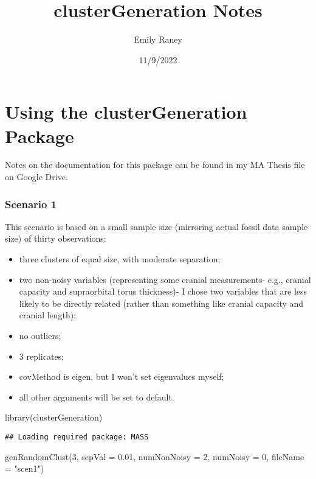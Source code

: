 \documentclass[
]{article}
\title{clusterGeneration Notes}
\author{Emily Raney}
\date{11/9/2022}
\newenvironment{Shaded}{\begin{snugshade}}{\end{snugshade}}
\newcommand{\AttributeTok}[1]{\textcolor[rgb]{0.77,0.63,0.00}{#1}}
\newcommand{\DecValTok}[1]{\textcolor[rgb]{0.00,0.00,0.81}{#1}}
\newcommand{\FloatTok}[1]{\textcolor[rgb]{0.00,0.00,0.81}{#1}}
\newcommand{\FunctionTok}[1]{\textcolor[rgb]{0.00,0.00,0.00}{#1}}
\newcommand{\NormalTok}[1]{#1}
\newcommand{\StringTok}[1]{\textcolor[rgb]{0.31,0.60,0.02}{#1}}
\providecommand{\tightlist}{%
  \setlength{\itemsep}{0pt}\setlength{\parskip}{0pt}}
\begin{document}
\maketitle

\hypertarget{using-the-clustergeneration-package}{%
\section{Using the clusterGeneration
Package}\label{using-the-clustergeneration-package}}

Notes on the documentation for this package can be found in my MA Thesis
file on Google Drive.

\hypertarget{scenario-1}{%
\subsubsection{Scenario 1}\label{scenario-1}}

This scenario is based on a small sample size (mirroring actual fossil
data sample size) of thirty observations:

\begin{itemize}
\tightlist
\item
  three clusters of equal size, with moderate separation;\\
\item
  two non-noisy variables (representing some cranial measurements- e.g.,
  cranial capacity and supraorbital torus thickness)- I chose two
  variables that are less likely to be directly related (rather than
  something like cranial capacity and cranial length);
\item
  no outliers;
\item
  3 replicates;
\item
  covMethod is eigen, but I won't set eigenvalues myself;
\item
  all other arguments will be set to default.
\end{itemize}

\begin{Shaded}
\begin{Highlighting}[]
\FunctionTok{library}\NormalTok{(clusterGeneration)}
\end{Highlighting}
\end{Shaded}

\begin{verbatim}
## Loading required package: MASS
\end{verbatim}

\begin{Shaded}
\begin{Highlighting}[]
\FunctionTok{genRandomClust}\NormalTok{(}\DecValTok{3}\NormalTok{, }\AttributeTok{sepVal =} \FloatTok{0.01}\NormalTok{, }\AttributeTok{numNonNoisy =} \DecValTok{2}\NormalTok{, }\AttributeTok{numNoisy =} \DecValTok{0}\NormalTok{, }\AttributeTok{fileName =} \StringTok{"scen1"}\NormalTok{)}
\end{Highlighting}
\end{Shaded}
\end{document}
